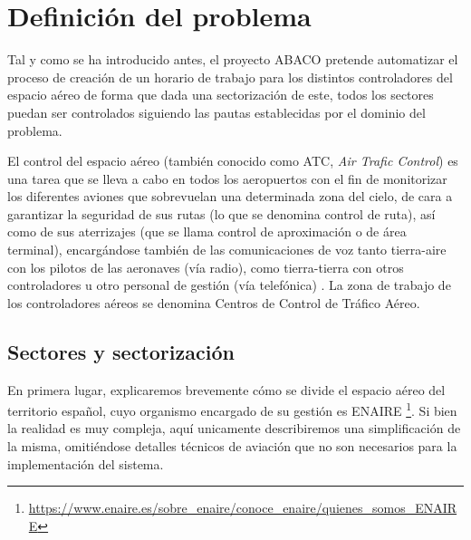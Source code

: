 \graphicspath{{capitulos/Capitulo2-Definicion-del-problema/recursos/}}

\section{Definición del problema} \label{apartado:2}

Tal y como se ha introducido antes, el proyecto ABACO pretende automatizar el proceso de creación de un horario de trabajo para
los distintos controladores del espacio aéreo de forma que dada una sectorización de este, todos los sectores puedan ser
controlados siguiendo las pautas establecidas por el dominio del problema.

El control del espacio aéreo (también conocido como ATC, \textit{Air Trafic Control}) es una tarea que se lleva a cabo en todos los aeropuertos con el fin de monitorizar los diferentes aviones que sobrevuelan una determinada zona del cielo, de cara a garantizar la seguridad de sus rutas (lo que se denomina control de ruta), así como de sus aterrizajes (que se llama control de aproximación o de área terminal), encargándose también de las comunicaciones de voz tanto tierra-aire con los pilotos de las aeronaves (vía radio), como tierra-tierra con otros controladores u otro personal de gestión (vía telefónica) \cite{ENAIRE-web, wazir2013mobile}.
La zona de trabajo de los controladores aéreos se denomina Centros de Control de Tráfico Aéreo.

\subsection{Sectores y sectorización}
En primera lugar, explicaremos brevemente cómo se divide el espacio aéreo del territorio español, cuyo organismo encargado de su gestión es ENAIRE
\footnote{\url{https://www.enaire.es/sobre_enaire/conoce_enaire/quienes_somos_ENAIRE}}. 
Si bien la realidad es muy compleja, aquí unicamente describiremos una simplificación de la misma, omitiéndose detalles técnicos de aviación que no son necesarios para la implementación del sistema.
\\

